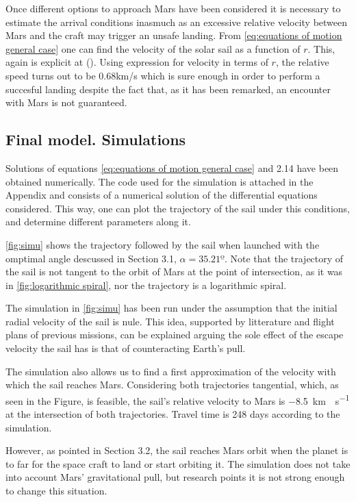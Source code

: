 \documentclass[twocolumn,12pt,a4paper]{article}
\numberwithin{equation}{section}
\begin{document}
Once different options to approach Mars have been considered it is necessary to estimate the arrival conditions inasmuch as an excessive relative velocity between Mars and the craft may trigger an unsafe landing. From \autoref{eq:equations of motion general case} one can find the velocity of the solar sail as a function of $r$. This, again is explicit at (\cite[p. 156]{mcinnes}). Using expression for velocity in terms of $r$, the relative speed turns out to be  $0.68$km/s which is sure enough in order to perform a succesful landing despite the fact that, as it has been remarked, an encounter with Mars is not guaranteed.

\subsection{Final model. Simulations}
Solutions of equations \ref{eq:equations of motion general case} and 2.14 have been obtained numerically. The code used for the simulation is attached in the Appendix and consists of a numerical solution of the differential equations considered. This way, one can plot the trajectory of the sail under this conditions, and determine different parameters along it.

 \autoref{fig:simu} shows the trajectory followed by the sail when launched with the omptimal angle descussed in Section 3.1, $\alpha=35.21º$. Note that the trajectory of the sail is not tangent to the orbit of Mars at the point of intersection, as it was in \autoref{fig:logarithmic spiral}, nor the trajectory is a logarithmic spiral.

The simulation in  \autoref{fig:simu} has been run under the assumption that the initial radial velocity of the sail is nule. This idea, supported by litterature and flight plans of previous missions, can be explained arguing the sole effect of the escape velocity the sail has is that of counteracting Earth's pull.

The simulation also allows us to find a first approximation of the velocity with which the sail reaches Mars. Considering both trajectories tangential, which, as seen in the Figure, is feasible, the sail's relative velocity to Mars is \SI{-8,5}{km\cdot s^{-1}} at the intersection of both trajectories. Travel time is 248 days according to the simulation.

However, as pointed in Section 3.2, the sail reaches Mars orbit when the planet is to far for the space craft to land or start orbiting it. The simulation does not take into account Mars' gravitational pull, but research points it is not strong enough to change this situation.
\end{document}
